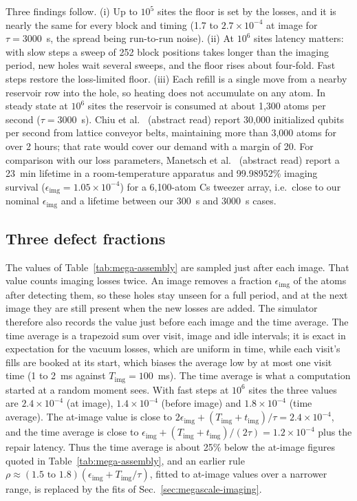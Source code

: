 Three findings follow. (i) Up to $10^5$ sites the floor is set by the losses, and it is nearly the same for every block and timing (1.7 to $2.7\times10^{-4}$ at image for $\tau=3000$~s, the spread being run-to-run noise). (ii) At $10^6$ sites latency matters: with slow steps a sweep of 252 block positions takes longer than the imaging period, new holes wait several sweeps, and the floor rises about four-fold. Fast steps restore the loss-limited floor. (iii) Each refill is a single move from a nearby reservoir row into the hole, so heating does not accumulate on any atom. In steady state at $10^6$ sites the reservoir is consumed at about 1,300 atoms per second ($\tau=3000$~s). Chiu et al.~\cite{chiu2025} (abstract read) report 30,000 initialized qubits per second from lattice conveyor belts, maintaining more than 3,000 atoms for over 2 hours; that rate would cover our demand with a margin of 20. For comparison with our loss parameters, Manetsch et al.~\cite{manetsch2024} (abstract read) report a 23~min lifetime in a room-temperature apparatus and 99.98952\% imaging survival ($\epsilon_\mathrm{img}=1.05\times10^{-4}$) for a 6,100-atom Cs tweezer array, i.e.\ close to our nominal $\epsilon_\mathrm{img}$ and a lifetime between our 300~s and 3000~s cases.

\subsection{Three defect fractions}\label{sec:megascale-defects}

The values of Table~\ref{tab:mega-assembly} are sampled just after each image. That value counts imaging losses twice. An image removes a fraction $\epsilon_\mathrm{img}$ of the atoms after detecting them, so these holes stay unseen for a full period, and at the next image they are still present when the new losses are added. The simulator therefore also records the value just before each image and the time average. The time average is a trapezoid sum over visit, image and idle intervals; it is exact in expectation for the vacuum losses, which are uniform in time, while each visit's fills are booked at its start, which biases the average low by at most one visit time (1 to 2~ms against $T_\mathrm{img}=100$~ms). The time average is what a computation started at a random moment sees. With fast steps at $10^6$ sites the three values are $2.4\times10^{-4}$ (at image), $1.4\times10^{-4}$ (before image) and $1.8\times10^{-4}$ (time average). The at-image value is close to $2\epsilon_\mathrm{img}+(T_\mathrm{img}+t_\mathrm{img})/\tau=2.4\times10^{-4}$, and the time average is close to $\epsilon_\mathrm{img}+(T_\mathrm{img}+t_\mathrm{img})/(2\tau)=1.2\times10^{-4}$ plus the repair latency. Thus the time average is about 25\% below the at-image figures quoted in Table~\ref{tab:mega-assembly}, and an earlier rule $\rho\approx(1.5\text{ to }1.8)(\epsilon_\mathrm{img}+T_\mathrm{img}/\tau)$, fitted to at-image values over a narrower range, is replaced by the fits of Sec.~\ref{sec:megascale-imaging}.

